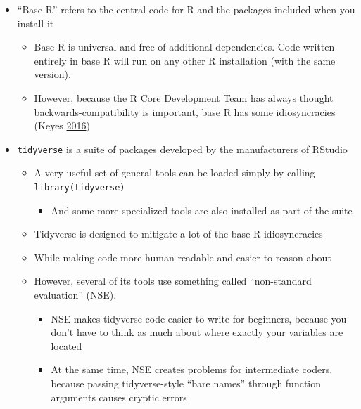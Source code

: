 \documentclass[
]{article}
\providecommand{\tightlist}{%
  \setlength{\itemsep}{0pt}\setlength{\parskip}{0pt}}
\begin{document}
\begin{itemize}
\tightlist
\item
  ``Base R'' refers to the central code for R and the packages included when you install it

  \begin{itemize}
  \tightlist
  \item
    Base R is universal and free of additional dependencies. Code written entirely in base R will run on any other R installation (with the same version).
  \item
    However, because the R Core Development Team has always thought backwards-compatibility is important, base R has some idiosyncracies (Keyes \protect\hyperlink{ref-KeyesRbitraryStandards2016}{2016})
  \end{itemize}
\item
  \texttt{tidyverse} is a suite of packages developed by the manufacturers of RStudio

  \begin{itemize}
  \tightlist
  \item
    A very useful set of general tools can be loaded simply by calling \texttt{library(tidyverse)}

    \begin{itemize}
    \tightlist
    \item
      And some more specialized tools are also installed as part of the suite
    \end{itemize}
  \item
    Tidyverse is designed to mitigate a lot of the base R idiosyncracies
  \item
    While making code more human-readable and easier to reason about
  \item
    However, several of its tools use something called ``non-standard evaluation'' (NSE).

    \begin{itemize}
    \tightlist
    \item
      NSE makes tidyverse code easier to write for beginners, because you don't have to think as much about where exactly your variables are located
    \item
      At the same time, NSE creates problems for intermediate coders, because passing tidyverse-style ``bare names'' through function arguments causes cryptic errors
    \end{itemize}
  \end{itemize}
\end{itemize}
\end{document}
